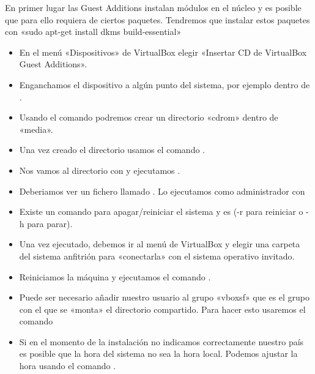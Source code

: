 \documentclass[letterpaper,10pt,spanish]{sphinxmanual}
\begin{document}
En primer lugar las Guest Additions instalan módulos en el núcleo y es posible que para ello requiera de ciertos paquetes. Tendremos que instalar estos paquetes con «sudo apt-get install dkms build-essential»
\begin{itemize}
\item {} 
En el menú «Dispositivos» de VirtualBox elegir «Insertar CD de VirtualBox Guest Additions».

\item {} 
Enganchamos el dispositivo  a algún punto del sistema, por ejemplo dentro de  .

\item {} 
Usando el comando  podremos crear un directorio «cdrom» dentro de «media».

\item {} 
Una vez creado el directorio usamos el comando  .

\item {} 
Nos vamos al directorio con   y ejecutamos  .

\item {} 
Deberiamos ver un fichero llamado  . Lo ejecutamos como administrador con 

\item {} 
Existe un comando para apagar/reiniciar el sistema y es  (-r para reiniciar o -h para parar).

\item {} 
Una vez ejecutado, debemos ir al menú de VirtualBox y elegir una carpeta del sistema anfitrión para «conectarla» con el sistema operativo invitado.

\item {} 
Reiniciamos la máquina y ejecutamos el comando .

\item {} 
Puede ser necesario añadir nuestro usuario al grupo «vboxsf» que es el grupo con el que se «monta» el directorio compartido. Para hacer esto usaremos el comando 

\item {} 
Si en el momento de la instalación no indicamos correctamente nuestro país es posible que la hora del sistema no sea la hora local. Podemos ajustar la hora usando el comando  .

\end{itemize}
\end{document}
